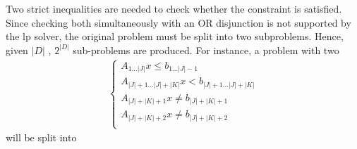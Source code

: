 \documentclass[runningheads]{llncs}
\begin{document}
Two strict inequalities are needed to check whether the constraint is satisfied.
Since checking both simultaneously with an OR disjunction is not supported by the \gls{lp} solver, the original problem must be split into two subproblems.
Hence, given $|D|$ \nqcs, $2^{|D|}$ sub-problems are produced.
For instance, a problem with two \nqcs
\begin{gather*}
    \begin{cases}
        A_{1 \dots |J|} x \le b_{1 \dots |J| - 1}                 \\
        A_{|J| + 1\dots |J| + |K|} x < b_{|J| + 1\dots |J| + |K|} \\
        A_{|J| + |K| + 1} x \ne b_{|J| + |K| + 1}                 \\
        A_{|J| + |K| + 2} x \ne b_{|J| + |K| + 2}                 \\
    \end{cases}
\end{gather*}
will be split into
\end{document}
